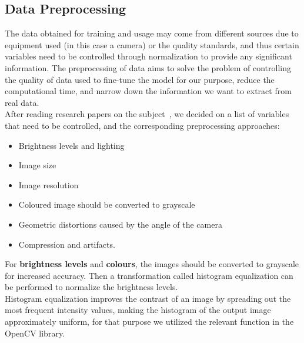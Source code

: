 \documentclass[twoside,a4paper]{article}
\begin{document}
\subsection{Data Preprocessing}

The data obtained for training and usage may come from different sources due to equipment used (in this case a camera) or the quality standards, and thus certain variables need to be controlled through normalization to provide any significant information. The preprocessing of data aims to solve the problem of controlling the quality of data used to fine-tune the model for our purpose, reduce the computational time, and narrow down the information we want to extract from real data.\\
After reading research papers on the subject~\cite{Tensmeyer2015}, we decided on a list of variables that need to be controlled, and the corresponding preprocessing approaches:
\begin{itemize}
    \item Brightness levels and lighting
    \item Image size
    \item Image resolution
    \item Coloured image should be converted to grayscale
    \item Geometric distortions caused by the angle of the camera
    \item Compression and artifacts.
\end{itemize}
For \textbf{brightness levels} and \textbf{colours}, the images should be converted to grayscale for increased accuracy. Then a transformation called histogram equalization can be performed to normalize the brightness levels.\\
Histogram equalization improves the contrast of an image by spreading out the most frequent intensity values, making the histogram of the output image approximately uniform, for that purpose we utilized the relevant function in the OpenCV library.~\cite{OpenCV_Histogram_Equalization}\\
\end{document}

